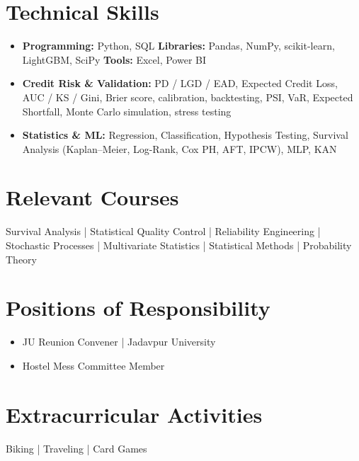 \documentclass[10pt,a4paper]{article}
\begin{document}
\section{Technical Skills}
\begin{itemize}
\item \textbf{Programming:} Python, SQL \quad \textbf{Libraries:} Pandas, NumPy, scikit-learn, LightGBM, SciPy \quad \textbf{Tools:} Excel, Power BI
\item \textbf{Credit Risk \& Validation:} PD / LGD / EAD, Expected Credit Loss, AUC / KS / Gini, Brier score, calibration, backtesting, PSI, VaR, Expected Shortfall, Monte Carlo simulation, stress testing
\item \textbf{Statistics \& ML:} Regression, Classification, Hypothesis Testing, Survival Analysis (Kaplan--Meier, Log-Rank, Cox PH, AFT, IPCW), MLP, KAN
\end{itemize}

\section{Relevant Courses}
Survival Analysis \;|\; Statistical Quality Control \;|\; Reliability Engineering \;|\; Stochastic Processes \;|\; Multivariate Statistics \;|\; Statistical Methods \;|\; Probability Theory

\section{Positions of Responsibility}
\begin{itemize}
\item JU Reunion Convener \;|\; Jadavpur University
\item Hostel Mess Committee Member
\end{itemize}

\section{Extracurricular Activities}
Biking \;|\; Traveling \;|\; Card Games
\end{document}
